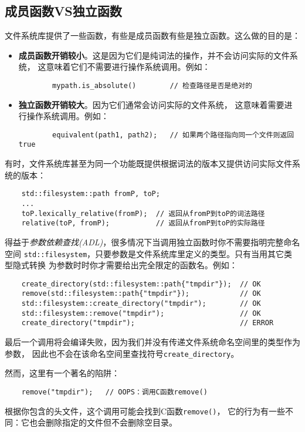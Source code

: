 \subsection{成员函数VS独立函数}
文件系统库提供了一些函数，有些是成员函数有些是独立函数。这么做的目的是：
\begin{itemize}
    \item \textbf{成员函数开销较小}。这是因为它们是纯词法的操作，并不会访问实际的文件系统，
    这意味着它们不需要进行操作系统调用。例如：
    \begin{lstlisting}
        mypath.is_absolute()        // 检查路径是否是绝对的
    \end{lstlisting}
    \item \textbf{独立函数开销较大}。因为它们通常会访问实际的文件系统，
    这意味着需要进行操作系统调用。例如：
    \begin{lstlisting}
        equivalent(path1, path2);   // 如果两个路径指向同一个文件则返回true
    \end{lstlisting}
\end{itemize}
有时，文件系统库甚至为同一个功能既提供根据词法的版本又提供访问实际文件系统的版本：
\begin{lstlisting}
    std::filesystem::path fromP, toP;
    ...
    toP.lexically_relative(fromP);  // 返回从fromP到toP的词法路径
    relative(toP, fromP);           // 返回从fromP到toP的实际路径
\end{lstlisting}
得益于\emph{参数依赖查找(ADL)}，很多情况下当调用独立函数时你不需要指明完整命名空间
\texttt{std::filesystem}，只要参数是文件系统库里定义的类型。只有当用其它类型隐式转换
为参数时时你才需要给出完全限定的函数名。例如：\label{ADL导致意外行为}
\begin{lstlisting}
    create_directory(std::filesystem::path{"tmpdir"});  // OK
    remove(std::filesystem::path{"tmpdir"});            // OK
    std::filesystem::create_directory("tmpdir");        // OK
    std::filesystem::remove("tmpdir");                  // OK
    create_directory("tmpdir");                         // ERROR
\end{lstlisting}
最后一个调用将会编译失败，因为我们并没有传递文件系统命名空间里的类型作为参数，
因此也不会在该命名空间里查找符号\texttt{create\_directory}。

然而，这里有一个著名的陷阱：
\begin{lstlisting}
    remove("tmpdir");   // OOPS：调用C函数remove()
\end{lstlisting}
根据你包含的头文件，这个调用可能会找到C函数\texttt{remove()}，
它的行为有一些不同：它也会删除指定的文件但不会删除空目录。

